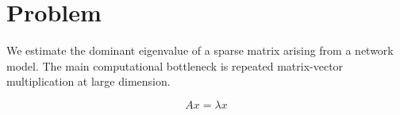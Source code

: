 \section{Problem}
We estimate the dominant eigenvalue of a sparse matrix arising from a network model.
The main computational bottleneck is repeated matrix-vector multiplication at large dimension.

\begin{equation}
A x = \lambda x
\end{equation}
